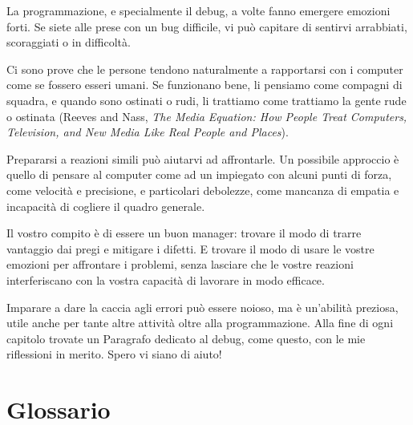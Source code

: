 \documentclass[10pt]{book}
\begin{document}
La programmazione, e specialmente il debug, a volte fanno emergere emozioni forti. Se siete alle prese con un bug difficile, vi può capitare di sentirvi arrabbiati, scoraggiati o in difficoltà.

Ci sono prove che le persone tendono naturalmente a rapportarsi con i computer come se fossero esseri umani. Se funzionano bene, li pensiamo come compagni di squadra, e quando sono ostinati o rudi, li trattiamo come trattiamo la gente rude o ostinata (Reeves and Nass, {\it The Media Equation: How People Treat Computers, Television, and New Media Like Real People and Places}).

Prepararsi a reazioni simili può aiutarvi ad affrontarle. Un possibile approccio è quello di pensare al computer come ad un impiegato con alcuni punti di forza, come velocità e precisione, e particolari debolezze, come mancanza di empatia e incapacità di cogliere il quadro generale.

Il vostro compito è di essere un buon manager: trovare il modo di trarre vantaggio dai pregi e mitigare i difetti. E trovare il modo di usare le vostre emozioni per affrontare i problemi, senza lasciare che le vostre reazioni interferiscano con la vostra capacità di lavorare in modo efficace.

Imparare a dare la caccia agli errori può essere noioso, ma è un'abilità preziosa, utile anche per tante altre attività oltre alla programmazione. Alla fine di ogni capitolo trovate un Paragrafo dedicato al debug, come questo, con le mie riflessioni in merito. Spero vi siano di aiuto!

\section{Glossario}
\end{document}
